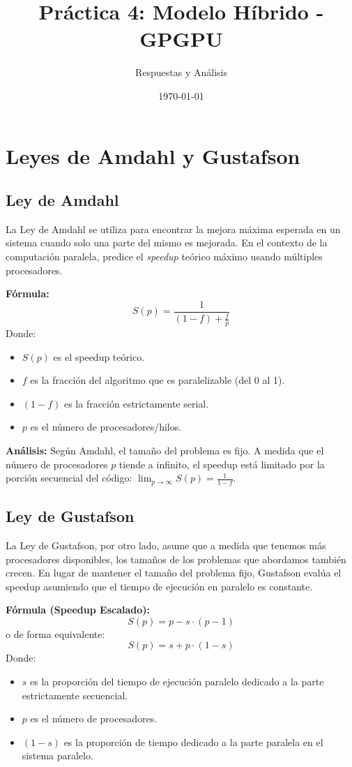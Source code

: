 \documentclass{article}
\title{Práctica 4: Modelo Híbrido - GPGPU}
\author{Respuestas y Análisis}
\date{\today}
\begin{document}
\maketitle

\section{Leyes de Amdahl y Gustafson}

\subsection{Ley de Amdahl}
La Ley de Amdahl se utiliza para encontrar la mejora máxima esperada en un sistema cuando solo una parte del mismo es mejorada. En el contexto de la computación paralela, predice el \textit{speedup} teórico máximo usando múltiples procesadores.

\textbf{Fórmula:}
\[
S(p) = \frac{1}{(1 - f) + \frac{f}{p}}
\]
Donde:
\begin{itemize}
    \item $S(p)$ es el speedup teórico.
    \item $f$ es la fracción del algoritmo que es paralelizable (del 0 al 1).
    \item $(1 - f)$ es la fracción estrictamente serial.
    \item $p$ es el número de procesadores/hilos.
\end{itemize}

\textbf{Análisis:}
Según Amdahl, el tamaño del problema es fijo. A medida que el número de procesadores $p$ tiende a infinito, el speedup está limitado por la porción secuencial del código: $\lim_{p \to \infty} S(p) = \frac{1}{1-f}$.

\subsection{Ley de Gustafson}
La Ley de Gustafson, por otro lado, asume que a medida que tenemos más procesadores disponibles, los tamaños de los problemas que abordamos también crecen. En lugar de mantener el tamaño del problema fijo, Gustafson evalúa el speedup asumiendo que el tiempo de ejecución en paralelo es constante.

\textbf{Fórmula (Speedup Escalado):}
\[
S(p) = p - s \cdot (p - 1)
\]
o de forma equivalente:
\[
S(p) = s + p \cdot (1 - s)
\]
Donde:
\begin{itemize}
    \item $s$ es la proporción del tiempo de ejecución paralelo dedicado a la parte estrictamente secuencial.
    \item $p$ es el número de procesadores.
    \item $(1 - s)$ es la proporción de tiempo dedicado a la parte paralela en el sistema paralelo.
\end{itemize}
\end{document}
